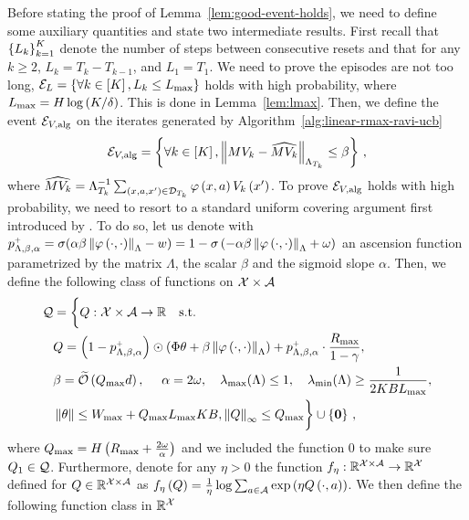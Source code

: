 Before stating the proof of Lemma~\ref{lem:good-event-holds}, we need to define some auxiliary quantities and state two intermediate results. First recall that $\left\{ L_k \right\}_{k=1}^K$ denote the number of steps between consecutive resets and that for any $k \geq 2$, $L_k = T_k - T_{k-1}$, and $L_1 = T_1$. We need to prove the episodes are not too long, \ie $\mathcal{E}_L = \left\{ \forall k \in \left[ K \right], L_k \leq L_{\max} \right\}$ holds with high probability, where $L_{\max} = H \log \left( K / \delta \right)$. This is done in Lemma~\ref{lem:lmax}. Then, we define the event $\mathcal{E}_{V, \mathrm{alg}}$ on the iterates generated by Algorithm~\ref{alg:linear-rmax-ravi-ucb}
%
\begin{equation*}
    \mathcal{E}_{V, \mathrm{alg}} = \left\{ \forall k \in \left[ K \right], \left\|M V_k - \widehat{M V_k}\right\|_{\Lambda_{T_k}} \leq \beta \right\}\,,
\end{equation*}
%
where $\widehat{M V_k} = \Lambda_{T_k}^{-1} \sum_{\left( x, a, x' \right) \in \mathcal{D}_{T_k}} \varphi \left( x, a \right) V_k \left( x' \right)$. To prove $\mathcal{E}_{V, \mathrm{alg}}$ holds with high probability, we need to resort to a standard uniform covering argument first introduced by \citealp{jin2019provably}. To do so, let us denote with $p^{\mathsf{\scriptscriptstyle +}}_{\Lambda, \beta, \alpha} = \sigma (\alpha \beta \left\|\varphi\left( \cdot,\cdot \right)\right\|_{\Lambda} - w) = 1 - \sigma \left( - \alpha \beta \left\|\varphi \left( \cdot, \cdot \right)\right\|_{\Lambda} + \omega \right)$ an ascension function parametrized by the matrix $\Lambda$, the scalar $\beta$ and the sigmoid slope $\alpha$. Then, we define the following class of functions on $\mathcal{X} \times \mathcal{A}$
%
\begin{align*}
    \mathcal{Q} &= \bigg\{Q: \mathcal{X}\times\mathcal{A} \rightarrow \mathbb{R} \quad \text{s.t.} \\
    &Q = \left( 1 - p^{\mathsf{\scriptscriptstyle +}}_{\Lambda, \beta, \alpha} \right) \odot \left( \Phi \theta + \beta \left\|\varphi \left( \cdot, \cdot \right)\right\|_{\Lambda} \right) + p^{\mathsf{\scriptscriptstyle +}}_{\Lambda, \beta, \alpha} \cdot \frac{R_{\max}}{1-\gamma}, \\
    &\beta = \widetilde{\mathcal{O}}\left({Q_{\max} d}\right), ~~~~\alpha = 2 \omega, ~~~\lambda_{\max}(\Lambda) \leq 1, ~~~\lambda_{\min}(\Lambda) \geq \frac{1}{2K B L_{\max}}, \\
    &\left\|\theta\right\| \leq W_{\max} + Q_{\max} L_{\max} K B, \left\|Q\right\|_\infty \leq Q_{\max} \bigg\} \cup \left\{ \mathbf{0} \right\}\,,
\end{align*}
%
where $Q_{\max} = H \left( R_{\max} + \frac{2 \omega}{\alpha} \right)$ and we included the function $0$ to make sure $Q_1 \in \mathcal{Q}$. Furthermore, denote for any $\eta > 0$ the function $f_\eta: \mathbb{R}^{\mathcal{X} \times \mathcal{A}} \rightarrow \mathbb{R}^{\mathcal{X}}$ defined for $Q \in \mathbb{R}^{\mathcal{X} \times \mathcal{A}}$ as $f_\eta \left( Q \right) = \frac1\eta \log \sum_{a \in \mathcal{A}} \exp \left( \eta Q \left( \cdot, a \right) \right)$. We then define the following function class in $\mathbb{R}^{\mathcal{X}}$
